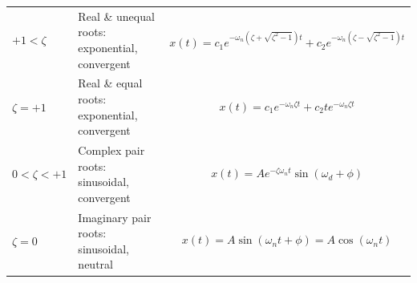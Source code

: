 \documentclass[
]{book}
\begin{document}
\begin{longtable}[]{@{}lll@{}}
\toprule
\endhead
\begin{minipage}[t]{0.13\columnwidth}\raggedright
\(+1 < \zeta\)\strut
\end{minipage} & \begin{minipage}[t]{0.39\columnwidth}\raggedright
Real \& unequal roots: exponential, convergent\strut
\end{minipage} & \begin{minipage}[t]{0.39\columnwidth}\raggedright
\[ x\left(t\right) = c_1 e^{-\omega_n \left( \zeta + \sqrt{\zeta^2 - 1} \right)t} + c_2 e^{-\omega_n \left( \zeta - \sqrt{\zeta^2 - 1} \right)t} \]\strut
\end{minipage}\tabularnewline
\begin{minipage}[t]{0.13\columnwidth}\raggedright
\(\zeta = +1\)\strut
\end{minipage} & \begin{minipage}[t]{0.39\columnwidth}\raggedright
Real \& equal roots: exponential, convergent\strut
\end{minipage} & \begin{minipage}[t]{0.39\columnwidth}\raggedright
\[ x\left(t\right) = c_1 e^{-\omega_n \zeta t} + c_2 t e^{-\omega_n \zeta t} \]\strut
\end{minipage}\tabularnewline
\begin{minipage}[t]{0.13\columnwidth}\raggedright
\(0 < \zeta < +1\)\strut
\end{minipage} & \begin{minipage}[t]{0.39\columnwidth}\raggedright
Complex pair roots: sinusoidal, convergent\strut
\end{minipage} & \begin{minipage}[t]{0.39\columnwidth}\raggedright
\[ x\left(t\right) =  A e^{-\zeta \omega_n t} \sin \left( \omega_d + \phi \right) \]\strut
\end{minipage}\tabularnewline
\begin{minipage}[t]{0.13\columnwidth}\raggedright
\(\zeta = 0\)\strut
\end{minipage} & \begin{minipage}[t]{0.39\columnwidth}\raggedright
Imaginary pair roots: sinusoidal, neutral\strut
\end{minipage} & \begin{minipage}[t]{0.39\columnwidth}\raggedright
\[ x\left(t\right) =  A \sin \left( \omega_n t + \phi \right) = A \cos \left( \omega_n t \right) \]\strut
\end{minipage}\tabularnewline

\end{longtable}
\end{document}
